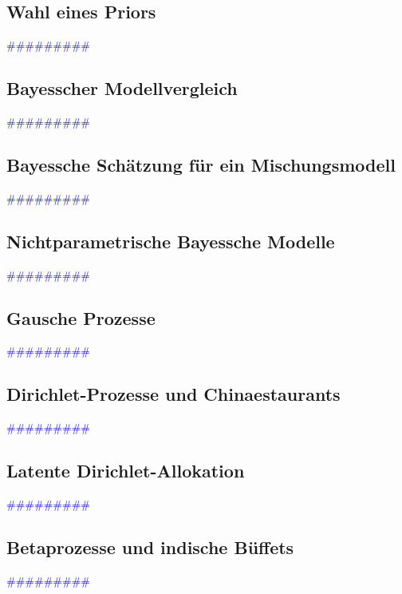 \documentclass{article}
\begin{document}
  \subsection{Wahl eines Priors} %
      \textcolor{blue}{\#\#\#\#\#\#\#\#\#}
  \subsection{Bayesscher Modellvergleich} %
      \textcolor{blue}{\#\#\#\#\#\#\#\#\#}
  \subsection{Bayessche Schätzung für ein Mischungsmodell} %
      \textcolor{blue}{\#\#\#\#\#\#\#\#\#}
  \subsection{Nichtparametrische Bayessche Modelle} %
      \textcolor{blue}{\#\#\#\#\#\#\#\#\#}
  \subsection{Gausche Prozesse} %
      \textcolor{blue}{\#\#\#\#\#\#\#\#\#}
  \subsection{Dirichlet-Prozesse und Chinaestaurants} %
      \textcolor{blue}{\#\#\#\#\#\#\#\#\#}
  \subsection{Latente Dirichlet-Allokation} %
      \textcolor{blue}{\#\#\#\#\#\#\#\#\#}
  \subsection{Betaprozesse und indische Büffets} %
      \textcolor{blue}{\#\#\#\#\#\#\#\#\#}
\end{document}
